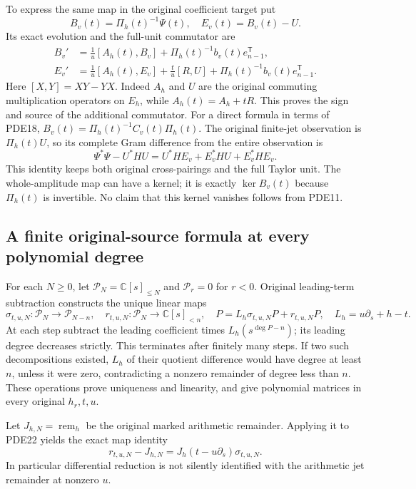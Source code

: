 To express the same map in the original coefficient target put
\[
 B_v(t)=\Pi_h(t)^{-1}\Psi(t),\quad E_v(t)=B_v(t)-U.
 \tag{PDE19}
\]
Its exact evolution and the full-unit commutator are
\[
 \begin{split}
 B_v'&=\frac1u[A_h(t),B_v]
                         +\Pi_h(t)^{-1}b_v(t)e_{n-1}^{\mathsf T},\\
 E_v'&=\frac1u[A_h(t),E_v]
          +\frac{t}{u}[R,U]
                         +\Pi_h(t)^{-1}b_v(t)e_{n-1}^{\mathsf T}.
 \end{split}
 \tag{PDE20}
\]
Here $[X,Y]=XY-YX$. Indeed $A_h$ and $U$ are the original commuting
multiplication operators on $E_h$, while $A_h(t)=A_h+tR$.
This proves the sign and source of the additional commutator.
For a direct formula in terms of PDE18,
$B_v(t)=\Pi_h(t)^{-1}C_v(t)\Pi_h(t)$.
The original finite-jet observation is $\Pi_h(t)U$, so its complete
Gram difference from the entire observation is
\[
 \Psi^*\Psi-U^*HU
       =U^*HE_v+E_v^*HU+E_v^*HE_v.
 \tag{PDE21}
\]
This identity keeps both original cross-pairings and the full Taylor
unit. The whole-amplitude map can have a kernel; it is exactly
$\ker B_v(t)$ because $\Pi_h(t)$ is invertible. No claim that this
kernel vanishes follows from PDE11.

\subsection{A finite original-source formula at every polynomial degree}

For each $N\geq0$, let $\mathcal P_N=\mathbb{C}[s]_{\leq N}$ and
$\mathcal P_r=0$ for $r<0$. Original leading-term subtraction constructs
the unique linear maps
\[
 \sigma_{t,u,N}:\mathcal P_N\longrightarrow\mathcal P_{N-n},\quad
 r_{t,u,N}:\mathcal P_N\longrightarrow\mathbb{C}[s]_{<n},\quad
 P=L_h\sigma_{t,u,N}P+r_{t,u,N}P,
 \quad L_h=u\partial_s+h-t.
 \tag{PDE22}
\]
At each step subtract the leading coefficient times
$L_h(s^{\deg P-n})$; its leading degree decreases strictly. This
terminates after finitely many steps. If two such decompositions
existed, $L_h$ of their quotient difference would have degree at least
$n$, unless it were zero, contradicting a nonzero remainder of degree
less than $n$. These operations prove uniqueness and linearity, and
give polynomial matrices in every original $h_r,t,u$.

Let $J_{h,N}=\operatorname{rem}_h$ be the original marked arithmetic
remainder. Applying it to PDE22 yields the exact map identity
\[
 r_{t,u,N}-J_{h,N}
    =J_h(t-u\partial_s)\sigma_{t,u,N}.
 \tag{PDE23}
\]
In particular differential reduction is not silently identified with
the arithmetic jet remainder at nonzero $u$.

